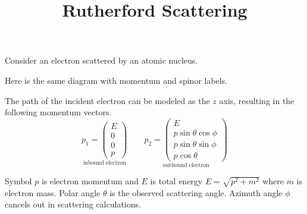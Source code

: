 \documentclass[12pt]{article}
\title{Rutherford Scattering}
\date{}
\author{}
\begin{document}
\maketitle

\noindent
Consider an electron scattered by an atomic nucleus.
\begin{center}
\end{center}

\noindent
Here is the same diagram with momentum and spinor labels.
\begin{center}
\end{center}

\noindent
The path of the incident electron can be modeled as the $z$ axis,
resulting in the following momentum vectors.
\begin{equation*}
\underset{\text{inbound electron}}
{p_1=\begin{pmatrix}E\\0\\0\\p\end{pmatrix}}
\qquad
\underset{\text{outbound electron}}
{
p_2=\begin{pmatrix}
E\\
p\sin\theta\cos\phi\\
p\sin\theta\sin\phi\\
p\cos\theta
\end{pmatrix}
}
\end{equation*}

\noindent
Symbol $p$ is electron momentum and
$E$ is total energy $E=\sqrt{p^2+m^2}$
where $m$ is electron mass.
Polar angle $\theta$ is the observed scattering angle.
Azimuth angle $\phi$ cancels out in scattering calculations.
\end{document}
